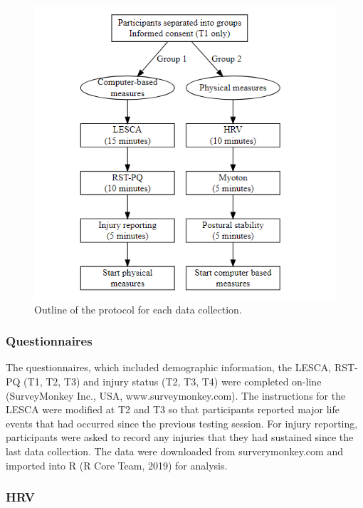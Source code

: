 \documentclass[
  english,
  man,floatsintext]{apa6}
\begin{document}
\begin{figure}

{\centering \includegraphics[width=1\linewidth]{figures_doc/sessionprotocol} 

}

\caption{Outline of the protocol for each data collection.}\label{fig:fig4}
\end{figure}

\hypertarget{questionnaires}{%
\subsubsection{Questionnaires}\label{questionnaires}}

The questionnaires, which included demographic information, the LESCA, RST-PQ (T1, T2, T3) and injury status (T2, T3, T4) were completed on-line (SurveyMonkey Inc., USA, www.surveymonkey.com).
The instructions for the LESCA were modified at T2 and T3 so that participants reported major life events that had occurred since the previous testing session.
For injury reporting, participants were asked to record any injuries that they had sustained since the last data collection.
The data were downloaded from surverymonkey.com and imported into R (R Core Team, 2019) for analysis.

\hypertarget{hrv}{%
\subsubsection{HRV}\label{hrv}}
\end{document}
